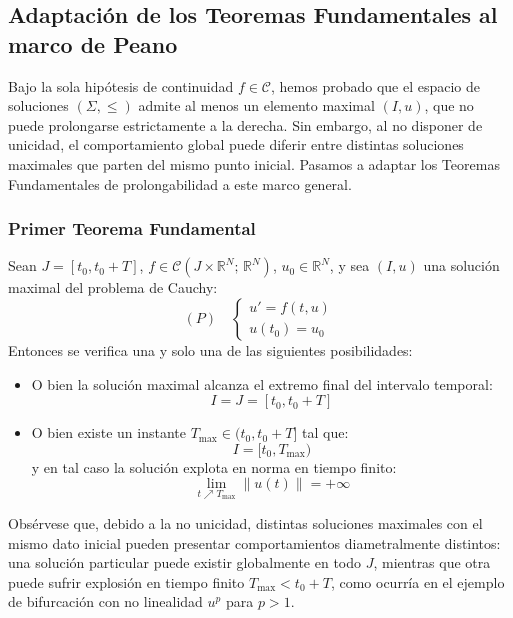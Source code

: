\subsection{Adaptación de los Teoremas Fundamentales al marco de Peano}

Bajo la sola hipótesis de continuidad $f \in \mathcal{C}$, hemos probado que el espacio de soluciones $(\Sigma, \leq)$ admite al menos un elemento maximal $(I, u)$, que no puede prolongarse estrictamente a la derecha. Sin embargo, al no disponer de unicidad, el comportamiento global puede diferir entre distintas soluciones maximales que parten del mismo punto inicial. Pasamos a adaptar los Teoremas Fundamentales de prolongabilidad a este marco general.

\subsubsection{Primer Teorema Fundamental}

\begin{teorema}
    Sean $J = [t_0, t_0 + T]$, $f \in \mathcal{C}(J \times \mathbb{R}^N; \, \mathbb{R}^N)$, $u_0 \in \mathbb{R}^N$, y sea $(I, u)$ una solución maximal del problema de Cauchy:
    \[
        (P) \quad
        \begin{cases}
            u' = f(t, u) \\
            u(t_0) = u_0
        \end{cases}
    \]
    Entonces se verifica una y solo una de las siguientes posibilidades:
    \begin{itemize}
        \item O bien la solución maximal alcanza el extremo final del intervalo temporal:
        \[
            I = J = [t_0, t_0 + T]
        \]
        \item O bien existe un instante $T_{\max} \in (t_0, t_0 + T]$ tal que:
        \[
            I = [t_0, T_{\max})
        \]
        y en tal caso la solución explota en norma en tiempo finito:
        \[
            \lim_{t \nearrow T_{\max}} \|u(t)\| = +\infty
        \]
    \end{itemize}
\end{teorema}

\begin{observación}
    Obsérvese que, debido a la no unicidad, distintas soluciones maximales con el mismo dato inicial pueden presentar comportamientos diametralmente distintos: una solución particular puede existir globalmente en todo $J$, mientras que otra puede sufrir explosión en tiempo finito $T_{\max} < t_0 + T$, como ocurría en el ejemplo de bifurcación con no linealidad $u^p$ para $p > 1$.
\end{observación}

